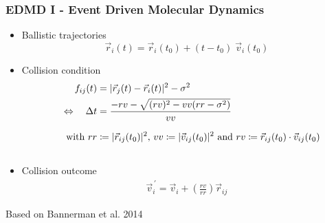 \documentclass[smaller,notes=hide]{beamer}
\newlength{\wideitemsep}
\let\olditem\item
\renewcommand{\item}{\setlength{\itemsep}{\wideitemsep}\olditem}
\begin{document}
\begin{frame}
\begin{columns}

\end{columns}
\end{frame}

\iffalse

\begin{frame}
\frametitle{EDMD I - Event Driven Molecular Dynamics}
\begin{itemize}
\item Ballistic trajectories
\begin{equation*}
\vec{r}_i(t) = \vec{r}_i(t_0) + (t-t_0) \; \vec{v}_i(t_0)
\end{equation*}
\item Collision condition
\begin{align*}
f_{ij}(t)  &=  | \vec{r}_j(t) - \vec{r}_i(t) |^2 - \sigma^2\\
\Leftrightarrow \quad \Delta t &= \frac{ - rv - \sqrt{ (rv)^2  - vv (rr - \sigma^2 )} }{vv} \raisebox{-0.5cm}{ \makebox[0.1cm]{}} \\
\qquad \text{with } rr &\coloneqq |\vec{r}_{ij}(t_0)|^2  \text{, } vv \coloneqq |\vec{v}_{ij}(t_0)|^2   \text{ and }  rv \coloneqq \vec{r}_{ij}(t_0) \cdot \vec{v}_{ij}(t_0) \raisebox{-0.5cm}{ \makebox[0.1cm]{}} 
\end{align*}
\item Collision outcome
\begin{align*}
\vec{v}_i^{\,'} = \vec{v}_i + \left( \frac{rv}{rr} \right) \vec{r}_{ij} 
\end{align*}
\end{itemize}
\vspace{0.25cm}
\hfill Based on Bannerman et al. 2014\cite{Bannerman2014}
\end{frame}
\end{document}
